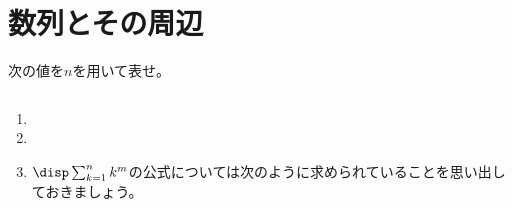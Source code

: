 \documentclass[a4paper]{ltjsarticle}
\begin{document}
\section{数列とその周辺}
\begin{question*}
次の値を$n$を用いて表せ。
\begin{ans*}
${}$
\begin{enumerate}[label=\arabic*.]
  \item
  \item
  \item
  \begin{supple*}
  $\disp \sum_{k=1}^{n}k^m$の公式については次のように求められていることを思い出しておきましょう。


\end{supple*}
\end{enumerate}
\end{ans*}
\end{question*}
\end{document}
